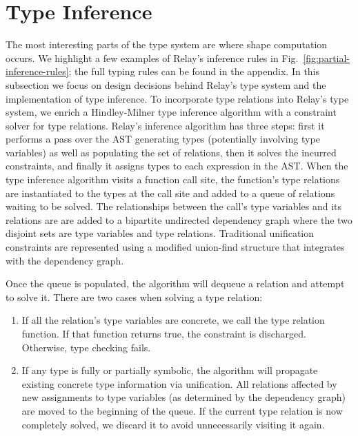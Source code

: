 \section{Type Inference}
\label{sec:inference}

The most interesting parts of the type system
are where shape computation occurs.
We highlight a few examples of Relay's inference
rules in Fig.~\ref{fig:partial-inference-rules};
the full typing rules can be found in the appendix.
In this subsection we focus on design decisions behind Relay's type system
and the implementation of type inference.
To incorporate type relations into Relay's type system, we enrich
a Hindley-Milner type inference algorithm with
a constraint solver for type relations.
Relay's inference algorithm has three steps: first it
performs a pass over the AST generating types (potentially involving type variables)
as well as populating the set of relations,
then it solves the incurred constraints,
and finally it assigns types to each expression in the AST.
When the type inference algorithm visits a function call site, the function's type relations are
instantiated to the types at the call site and added to a queue of relations waiting to be
solved.
The relationships between the call's type variables and its relations are are added to a
bipartite undirected dependency graph where the two disjoint sets are type variables and type relations.
Traditional unification constraints are represented using a modified union-find structure that
integrates with the dependency graph.

Once the queue is populated, the algorithm will dequeue a relation and attempt to solve it.
There are two cases when solving a type relation:
\begin{enumerate}
\item If all the relation's type variables
are concrete, we call the type relation function. If that function returns true, the
constraint is discharged. Otherwise, type checking fails.
\item If any type is fully or partially symbolic, the
  algorithm will propagate
  existing concrete type information via unification.
All relations affected by new assignments to type
  variables (as determined by the dependency graph)
  are moved to the beginning of the queue.
If the current type relation is now completely solved, we
discard it to avoid unnecessarily visiting it again.
\end{enumerate}

